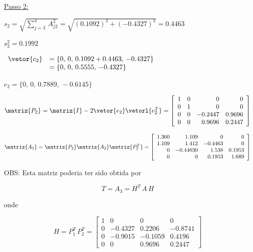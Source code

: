 \begin{example}
\begin{enumerar}
\end{enumerar}

\underline{Passo 2:}

\begin{enumerar}

\item $ s_2 = \sqrt{\displaystyle\sum_{j=3}^4 \, A_{j2}^2} = \sqrt{(0.1092)^2 + (-0.4327)^2} = 0.4463 $

$ s_2^2 = 0.1992 $

\item $
\begin{array}{rl}
 \vetor{c_2} & = \{0, \, 0, \, 0.1092 + 0.4463, \, -0.4327\} \\
             & = \{0, \, 0, \, 0.5555, \, -0.4327\}
\end{array}
$

\item $ e_2 = \{0, \, 0, \, 0.7889, \, -0.6145 \} $

\item $ \matriz{P_2} = \matriz{I} - 2 \vetor{e_2} \vetorl{e_2^T} =
\left[
 \begin{array}{ccrr}
  1 & 0 & 0 & 0\\
  0 & 1 & 0 & 0\\
  0 & 0 & -0.2447 & 0.9696\\
  0 & 0 & 0.9696 & 0.2447
 \end{array}
\right]
$

\item $ \matriz{A_3} = \matriz{P_2} \matriz{A_2} \matriz{P_2^T} =
\left[
 \begin{array}{rrrr}
  1.360 & 1.109 & 0 & 0\\
  1.109 & 1.412 & -0.4463 & 0\\
  0 & -0.44630 & 1.538 & 0.1953\\
  0 & 0 & 0.1953 & 1.689
 \end{array}
\right]
$

\end{enumerar}

OBS: Esta matriz poderia ter sido obtida por

\[
 T = A_3 = H^T \, A \, H
\]

onde

\[
 H = P_1^T \, P_2^T = 
 \left[
  \begin{array}{rrrr}
   1 & 0 & 0 & 0\\
   0 & -0.4327 & 0.2206 & -0.8741\\
   0 & -0.9015 & -0.1059 & 0.4196\\
   0 & 0 & 0.9696 & 0.2447
  \end{array}
 \right]
\]

\end{example}

